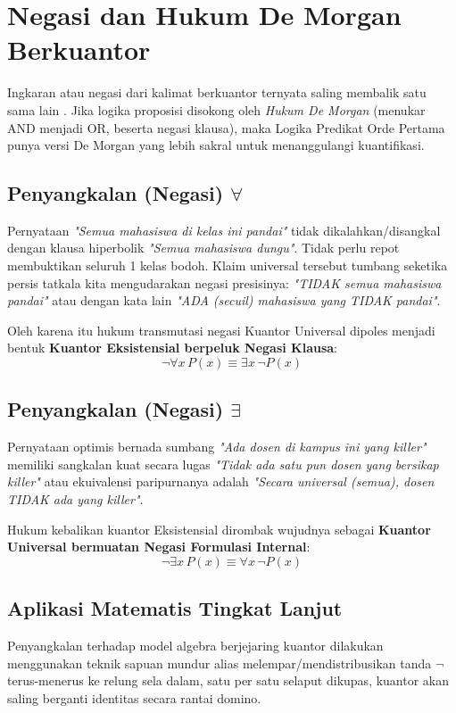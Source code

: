 \section{Negasi dan Hukum De Morgan Berkuantor}

Ingkaran atau negasi dari kalimat berkuantor ternyata saling membalik satu sama lain \cite{rosen2019}. Jika logika proposisi disokong oleh \textit{Hukum De Morgan} (menukar AND menjadi OR, beserta negasi klausa), maka Logika Predikat Orde Pertama punya versi De Morgan yang lebih sakral untuk menanggulangi kuantifikasi.

\subsection{Penyangkalan (Negasi) $\forall$}
Pernyataan \textit{"Semua mahasiswa di kelas ini pandai"} tidak dikalahkan/disangkal dengan klausa hiperbolik \textit{"Semua mahasiswa dungu"}. Tidak perlu repot membuktikan seluruh 1 kelas bodoh. Klaim universal tersebut tumbang seketika persis tatkala kita mengudarakan negasi presisinya: \textit{"TIDAK semua mahasiswa pandai"} atau dengan kata lain \textit{"ADA (secuil) mahasiswa yang TIDAK pandai"}.

Oleh karena itu hukum transmutasi negasi Kuantor Universal dipoles menjadi bentuk \textbf{Kuantor Eksistensial berpeluk Negasi Klausa}:
\[ \neg \forall x \, P(x) \equiv \exists x \, \neg P(x) \]

\subsection{Penyangkalan (Negasi) $\exists$}
Pernyataan optimis bernada sumbang \textit{"Ada dosen di kampus ini yang killer"} memiliki sangkalan kuat secara lugas \textit{"Tidak ada satu pun dosen yang bersikap \textit{killer}"} atau ekuivalensi paripurnanya adalah \textit{"Secara universal (semua), dosen TIDAK ada yang killer"}.

Hukum kebalikan kuantor Eksistensial dirombak wujudnya sebagai \textbf{Kuantor Universal bermuatan Negasi Formulasi Internal}:
\[ \neg \exists x \, P(x) \equiv \forall x \, \neg P(x) \]

\subsection{Aplikasi Matematis Tingkat Lanjut}

Penyangkalan terhadap model algebra berjejaring kuantor dilakukan menggunakan teknik sapuan mundur alias melempar/mendistribusikan tanda $\neg$ terus-menerus ke relung sela dalam, satu per satu selaput dikupas, kuantor akan saling berganti identitas secara rantai domino.

